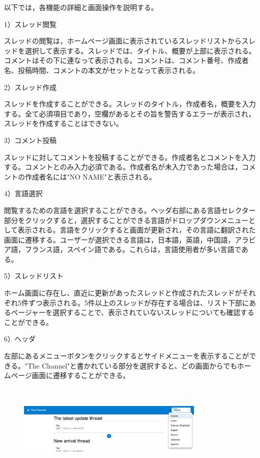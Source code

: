\documentclass[b5paper,12pt]{jsreport}
\begin{document}
以下では，各機能の詳細と画面操作を説明する。

1）スレッド閲覧

スレッドの閲覧は，ホームページ画面に表示されているスレッドリストからスレッドを選択して表示する。スレッドでは、タイトル、概要が上部に表示される。コメントはその下に連なって表示される。コメントは、コメント番号、作成者名、投稿時間、コメントの本文がセットとなって表示される。

2）スレッド作成

スレッドを作成することができる。スレッドのタイトル，作成者名，概要を入力する。全て必須項目であり，空欄があるとその旨を警告するエラーが表示され，スレッドを作成することはできない。

3）コメント投稿

スレッドに対してコメントを投稿することができる。作成者名とコメントを入力する。コメントとのみ入力必須である。作成者名が未入力であった場合は，コメントの作成者名には"NO NAME"と表示される。

4）言語選択

閲覧するための言語を選択することができる。ヘッダ右部にある言語セレクター部分をクリックすると，選択することができる言語がドロップダウンメニューとして表示される。言語をクリックすると画面が更新され，その言語に翻訳された画面に遷移する。ユーザーが選択できる言語は，日本語，英語，中国語，アラビア語，フランス語，スペイン語である。これらは，言語使用者が多い言語である。

5）スレッドリスト

ホーム画面に存在し、直近に更新があったスレッドと作成されたスレッドがそれぞれ5件ずつ表示される。5件以上のスレッドが存在する場合は、リスト下部にあるページャーを選択することで、表示されていないスレッドについても確認することができる。

6）ヘッダ

左部にあるメニューボタンをクリックするとサイドメニューを表示することができる。"The Channel"と書かれている部分を選択すると、どの画面からでもホームページ画面に遷移することができる。


\begin{figure}[htbp]
	\centering
	\includegraphics[width=90mm,height=45mm]{./img/select_language.png}

\end{figure}
\end{document}
